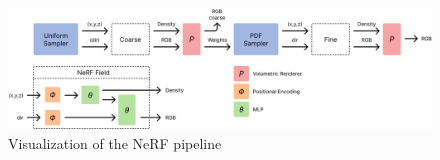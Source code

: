 \begin{figure}[h]
    \centering
    \includegraphics[width=1.0\textwidth]{figures/nerf-pipeline-overview.png}
    \caption{Visualization of the NeRF pipeline}
    \label{fig:nerf-pipeline}
\end{figure}